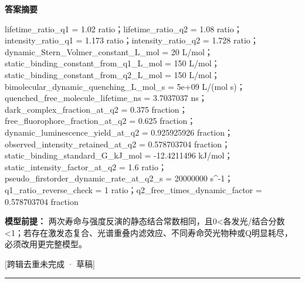 \documentclass[UTF8,11pt,a4paper]{ctexart}
\begin{document}
\noindent\textbf{答案摘要}\par
lifetime\_ratio\_q1 = 1.02 ratio；lifetime\_ratio\_q2 = 1.08 ratio；intensity\_ratio\_q1 = 1.173 ratio；intensity\_ratio\_q2 = 1.728 ratio；dynamic\_Stern\_Volmer\_constant\_L\_mol = 20 L/mol；static\_binding\_constant\_from\_q1\_L\_mol = 150 L/mol；static\_binding\_constant\_from\_q2\_L\_mol = 150 L/mol；bimolecular\_dynamic\_quenching\_L\_mol\_s = 5e+09 L/(mol s)；quenched\_free\_molecule\_lifetime\_ns = 3.7037037 ns；dark\_complex\_fraction\_at\_q2 = 0.375 fraction；free\_fluorophore\_fraction\_at\_q2 = 0.625 fraction；dynamic\_luminescence\_yield\_at\_q2 = 0.925925926 fraction；observed\_intensity\_retained\_at\_q2 = 0.578703704 fraction；static\_binding\_standard\_G\_kJ\_mol = -12.4211496 kJ/mol；static\_intensity\_factor\_at\_q2 = 1.6 ratio；pseudo\_firstorder\_dynamic\_rate\_at\_q2\_s = 20000000 s\textasciicircum{}-1；q1\_ratio\_reverse\_check = 1 ratio；q2\_free\_times\_dynamic\_factor = 0.578703704 fraction\par
\noindent\textbf{模型前提：}
两次寿命与强度反演的静态结合常数相同，且0<各发光/结合分数<1；若存在激发态复合、光谱重叠内滤效应、不同寿命荧光物种或Q明显耗尽，必须改用更完整模型。\par
\noindent\textcolor{red!65!black}{[跨辑去重未完成 · 草稿]} \par
\medskip\hrule\medskip
{}
\end{document}
